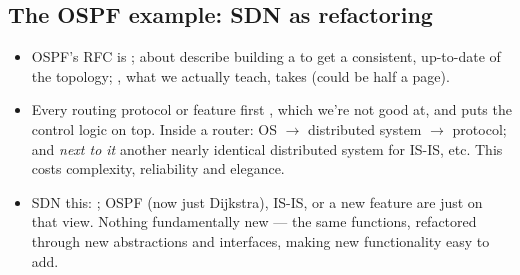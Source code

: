\subsection{The OSPF example: SDN as refactoring}
\begin{itemize}
\item OSPF's RFC is ; about  describe building a  to get a consistent, up-to-date  of the topology; , what we actually teach, takes  (could be half a page).
\item Every routing protocol or feature first , which we're not good at, and puts the control logic on top. Inside a router: OS $\to$ distributed system $\to$ protocol; and \emph{next to it} another nearly identical distributed system for IS-IS, etc. This  costs complexity, reliability and elegance.
\item SDN  this: ; OSPF (now just Dijkstra), IS-IS, or a new feature are just  on that view. Nothing fundamentally new --- the same functions, refactored through new abstractions and interfaces, making new functionality easy to add.
\end{itemize}

